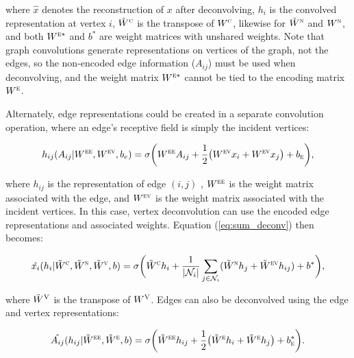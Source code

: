 \noindent
where $\hat{x}$ denotes the reconstruction of $x$ after deconvolving, $h_i$ is the convolved representation at vertex $i$, $\tilde{W}^\textsc{c}$ is the transpose of $W^\textsc{c}$, likewise for $\tilde{W}^\textsc{n}$ and $W^\textsc{n}$, and both $W^{\textsc{e}*}$ and $b^*$ are weight matrices with unshared weights. 
Note that graph convolutions generate representations on vertices of the graph, not the edges, so the non-encoded edge information ($A_{ij}$) must be used when deconvolving, and the weight matrix $W^{\textsc{e}*}$ cannot be tied to the encoding matrix $W^{\textsc{e}}$.

Alternately, edge representations could be created in a separate convolution operation, where an edge's receptive field is simply the incident vertices:

\begin{equation}
h_{ij}(A_{ij} |W^{\textsc{ee}}, W^{\textsc{ev}}, b_e) = \sigma\bigg( W^{\textsc{ee}} A_{ij} + \frac{1}{2}\big(
W^{\textsc{ev}} x_i + W^{\textsc{ev}} x_j \big) + b_\textsc{e} \bigg),
\label{eq:edge_conv}
\end{equation}

\noindent
where $h_{ij}$ is the representation of edge $(i, j)$ , $W^{\textsc{ee}}$ is the weight matrix associated with the edge, and $W^{\textsc{ev}}$ is the weight matrix associated with the incident vertices.
In this case, vertex deconvolution can use the encoded edge representations and associated weights.
Equation (\ref{eq:sum_deconv}) then becomes:

\begin{equation}
\hat{x_i}(h_i | \tilde{W}^\textsc{c}, \tilde{W}^\textsc{n}, \tilde{W}^\textsc{v}, b) = \sigma \bigg( \tilde{W}^{\textsc{c}} h_i + \frac{1}{|\mathcal{N}_i|}\sum_{j \in \mathcal{N}_i} (\tilde{W}^{\textsc{n}} h_j + \tilde{W}^{\textsc{ev}} h_{ij}) + b^* \bigg),
\label{eq:sum_deconv2}
\end{equation}

\noindent
where $\tilde{W}^{\textsc{V}}$ is the transpose of $W^{\textsc{V}}$.
Edges can also be deconvolved using the edge and vertex representations:

\begin{equation}
\hat{A_{ij}}(h_{ij} |\tilde{W}^{\textsc{ee}}, \tilde{W}^{\textsc{e}}, b) = \sigma \bigg( \tilde{W}^{\textsc{ee}} h_{ij} + \frac{1}{2}\big(
\tilde{W}^{\textsc{e}} h_i + \tilde{W}^{\textsc{e}} h_j \big) + b^{*}_\textsc{e} \bigg).
\label{eq:edge_conv}
\end{equation}

